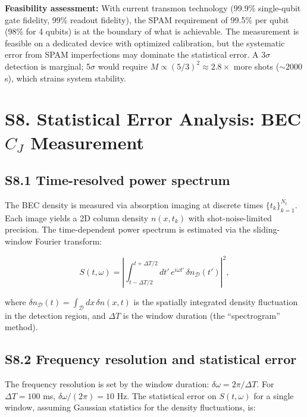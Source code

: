 \documentclass[prd,aps,showpacs,superscriptaddress,twocolumn]{revtex4-2}
\begin{document}
\textbf{Feasibility assessment:} With current transmon technology (99.9\% single-qubit gate fidelity, 99\% readout fidelity), the SPAM requirement of 99.5\% per qubit (98\% for 4 qubits) is at the boundary of what is achievable. The measurement is feasible on a dedicated device with optimized calibration, but the systematic error from SPAM imperfections may dominate the statistical error. A 3$\sigma$ detection is marginal; 5$\sigma$ would require $M \propto (5/3)^2 \approx 2.8\times$ more shots ($\sim 2000$ s), which strains system stability.

\section{S8. Statistical Error Analysis: BEC $C_J$ Measurement}

\subsection{S8.1 Time-resolved power spectrum}

The BEC density is measured via absorption imaging at discrete times $\{t_k\}_{k=1}^{N_t}$. Each image yields a 2D column density $n(x,t_k)$ with shot-noise-limited precision. The time-dependent power spectrum is estimated via the sliding-window Fourier transform:

\begin{equation}
S(t,\omega) = \left| \int_{t-\Delta T/2}^{t+\Delta T/2} dt' \, e^{i\omega t'} \, \delta n_{\mathcal{D}}(t') \right|^2,
\label{eq:S_t_omega}
\end{equation}

where $\delta n_{\mathcal{D}}(t) = \int_{\mathcal{D}} dx \, \delta n(x,t)$ is the spatially integrated density fluctuation in the detection region, and $\Delta T$ is the window duration (the ``spectrogram'' method).

\subsection{S8.2 Frequency resolution and statistical error}

The frequency resolution is set by the window duration: $\delta\omega = 2\pi / \Delta T$. For $\Delta T = 100$ ms, $\delta\omega/(2\pi) = 10$ Hz. The statistical error on $S(t,\omega)$ for a single window, assuming Gaussian statistics for the density fluctuations, is:
\end{document}
